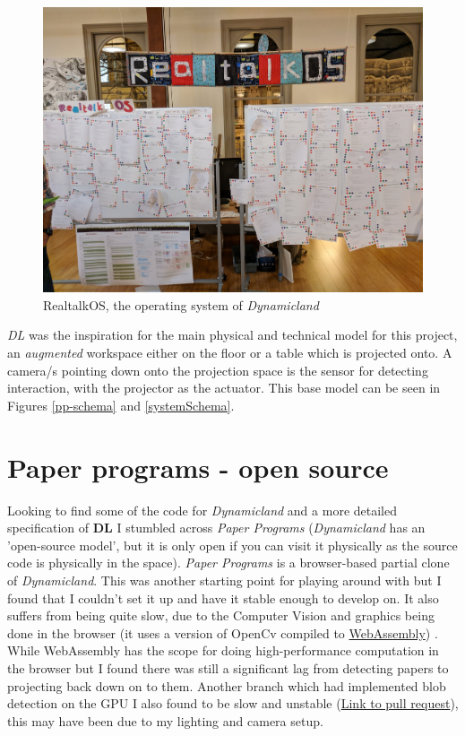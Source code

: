 \documentclass[12pt]{report}
\begin{document}
\begin{figure}[htbp]
\centering
\includegraphics[width=12cm]{assets/realtalk-os.jpg}
\caption{RealtalkOS, the operating system of \emph{Dynamicland}}
\end{figure}  


\emph{DL} was the inspiration for the main physical and technical model for
this project, an \emph{augmented} workspace either on the floor or a table which is
projected onto. A camera/s pointing down onto the projection space is the sensor
for detecting interaction, with the projector as the actuator. This base model can be
seen in Figures \ref{pp-schema} and  \ref{systemSchema}.

\section{Paper programs - open source}
\label{sec:org2add96e}

Looking to find some of the code for \emph{Dynamicland} and a more detailed
specification of \textbf{DL} I stumbled across \emph{Paper Programs} (\emph{Dynamicland} has an
'open-source model', but it is only open if you can visit it physically as the
source code is physically in the space). \emph{Paper Programs} is a browser-based
partial clone of \emph{Dynamicland}. This was another starting point for playing
around with but I found that I couldn't set it up and have it stable enough to
develop on. It also suffers from being quite slow, due to the Computer Vision
and graphics being done in the browser (it uses a version of OpenCv compiled to
\href{https://webassembly.org/}{WebAssembly}) \cite{JpPaperPrograms}. While WebAssembly has the scope for doing
high-performance computation in the browser but I found there was still a
significant lag from detecting papers to projecting back down on to them.
Another branch which had implemented blob detection on the GPU I also found to
be slow and unstable (\href{https://github.com/janpaul123/paperprograms/pull/28}{Link to pull request}), this may have been due to my
lighting and camera setup.
\end{document}
